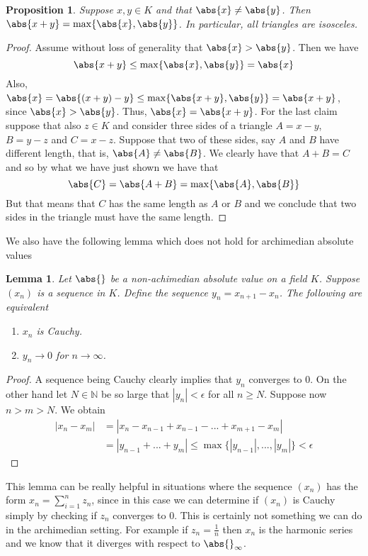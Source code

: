 \documentclass{article}
\newtheorem{proposition}{Proposition}[section]
\newtheorem{lemma}{Lemma}[section]
\newcommand{\mbb}[1]{\mathbb{#1}}
\numberwithin{equation}{section}
\begin{document}
\begin{proposition}\label{prop: Triangles are isosceles}
	Suppose $x,y \in K$ and that $\abs{x} \neq \abs{y}$. Then $\abs{x + y} = \max \{\abs{x}, \abs{y}\}$. In particular, all triangles are isosceles.
\end{proposition}
\begin{proof}
	Assume without loss of generality that $\abs{x} > \abs{y}$. Then we have
	$$\abs{x + y} \leq \max \{\abs{x}, \abs{y}\} =\abs{x}$$
	Also, $\abs{x} = \abs{(x + y) - y} \leq \max\{\abs{x + y}, \abs{y}\} = \abs{x + y}$, since $\abs{x} > \abs{y}$. Thus, $\abs{x} = \abs{x + y}$. For the last claim suppose that also $z \in K$ and consider three sides of a triangle $A = x - y$, $B = y - z$ and $C = x-z$. Suppose that two of these sides, say $A$ and $B$ have different length, that is, $\abs{A} \neq \abs{B}$. We clearly have that $A + B = C$ and so by what we have just shown we have that
	$$\abs{C} = \abs{A + B} = \max\{\abs{A}, \abs{B}\}$$
	But that means that $C$ has the same length as $A$ or $B$ and we conclude that two sides in the triangle must have the same length.
\end{proof}

We also have the following lemma which does not hold for archimedian absolute values

\begin{lemma} \label{lem:SufficientConditionForConvergence}
	Let $\abs{}$ be a non-achimedian absolute value on a field $K$. Suppose $(x_n)$ is a sequence in $K$. Define the sequence $y_n = x_{n+1} - x_{n}$. The following are equivalent
	\begin{enumerate}
    	\item $x_n$ is Cauchy.
    	\item $y_n \to 0$ for $n \to \infty$.
	\end{enumerate}
\end{lemma}
\begin{proof}
	A sequence being Cauchy clearly implies that $y_n$ converges to 0. On the other hand let $N \in \mbb N$ be so large that $|y_n| < \epsilon$ for all $n \geq N$. Suppose now $n > m > N$. We obtain
	\begin{align*}
    	|x_n - x_m| & = |x_n - x_{n-1} + x_{n-1} - ... + x_{m+1} - x_{m}|                      	\\
                	& = |y_{n-1} + ... + y_{m}| \leq \max \{|y_{n-1}|, ..., |y_m|  \} < \epsilon
	\end{align*}
\end{proof}
This lemma can be really helpful in situations where the sequence $(x_n)$ has the form $x_n = \sum_{i = 1}^n z_n$, since in this case we can determine if $(x_n)$ is Cauchy simply by checking if $z_n$ converges to 0. This is certainly not something we can do in the archimedian setting. For example if $z_n = \frac{1}{n}$ then $x_n$ is the harmonic series and we know that it diverges with respect to $\abs{}_\infty$.
\end{document}
